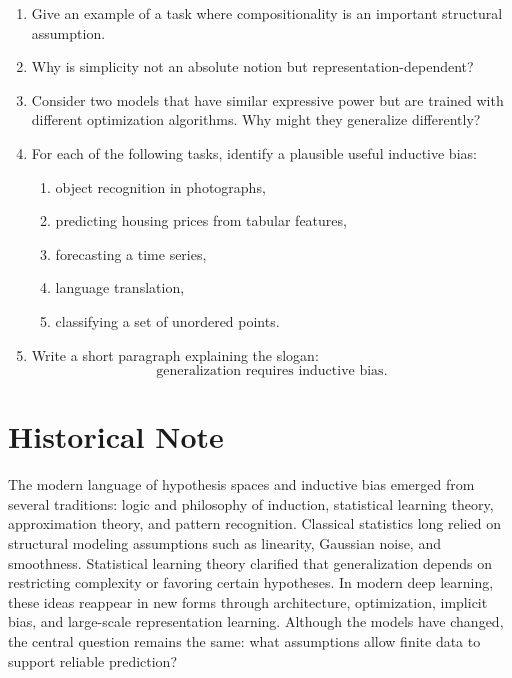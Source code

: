\begin{enumerate}
    \item Give an example of a task where compositionality is an important structural assumption.

    \item Why is simplicity not an absolute notion but representation-dependent?

    \item Consider two models that have similar expressive power but are trained with different optimization algorithms. Why might they generalize differently?

    \item For each of the following tasks, identify a plausible useful inductive bias:
    \begin{enumerate}
        \item object recognition in photographs,
        \item predicting housing prices from tabular features,
        \item forecasting a time series,
        \item language translation,
        \item classifying a set of unordered points.
    \end{enumerate}

    \item Write a short paragraph explaining the slogan:
    \[
    \text{generalization requires inductive bias}.
    \]
\end{enumerate}

\section*{Historical Note}

The modern language of hypothesis spaces and inductive bias emerged from several traditions: logic and philosophy of induction, statistical learning theory, approximation theory, and pattern recognition. Classical statistics long relied on structural modeling assumptions such as linearity, Gaussian noise, and smoothness. Statistical learning theory clarified that generalization depends on restricting complexity or favoring certain hypotheses. In modern deep learning, these ideas reappear in new forms through architecture, optimization, implicit bias, and large-scale representation learning. Although the models have changed, the central question remains the same: what assumptions allow finite data to support reliable prediction?